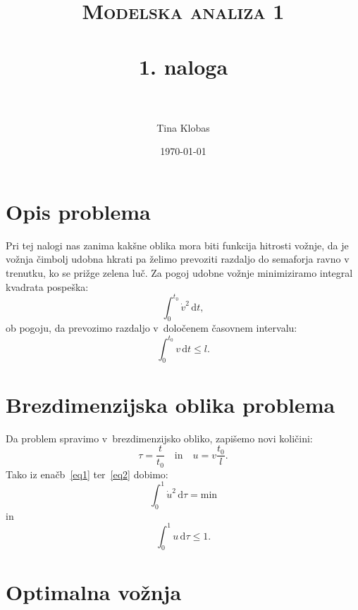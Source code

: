 \documentclass[a4paper,pdftex,12pt]{article} %
\title{	
\normalfont \normalsize 
\textsc{Modelska analiza 1} \\ [25pt] %
\horrule{0.2pt} \\[0.4cm] %
\huge 1. naloga\\ %
\horrule{0.2pt} \\[0.5cm] %
}
\author{Tina Klobas} %
\date{\normalsize\today} %
\numberwithin{equation}{section} %
\numberwithin{figure}{section} %
\numberwithin{table}{section} %
\begin{document}
\maketitle %

\section{Opis problema}
Pri tej nalogi nas zanima kakšne oblika mora biti funkcija hitrosti vožnje, da je vožnja
čimbolj udobna hkrati pa želimo prevoziti razdaljo do semaforja ravno v trenutku, ko se
prižge zelena luč. Za pogoj udobne vožnje minimiziramo integral kvadrata pospeška:
\begin{equation} \label{eq1}
    \int_0^{t_0} \! \dot v^2 \, \mathrm{d}t,
\end{equation}
ob pogoju, da prevozimo razdaljo v~določenem časovnem intervalu:
\begin{equation} \label{eq2}
    \int_0^{t_0} \! v \,  \mathrm{d}t \leq l.
\end{equation}


\section{Brezdimenzijska oblika problema}
Da problem spravimo v~brezdimenzijsko obliko, zapišemo novi količini:
\begin{equation*}
    \tau = \frac{t}{t_0} \quad \mathrm{in} \quad u=v\frac{t_0}{l}.
\end{equation*}
Tako iz enačb~\ref{eq1} ter~\ref{eq2} dobimo:
\begin{equation} \label{eq3}
    \int_0^1 \! \dot u^2 \, \mathrm{d}\tau = \mathrm{min}
\end{equation}
in
\begin{equation}\label{vez}
    \int_0^1 \! u \, \mathrm{d}\tau \leq 1.
\end{equation}


\section{Optimalna vožnja}
\end{document}
